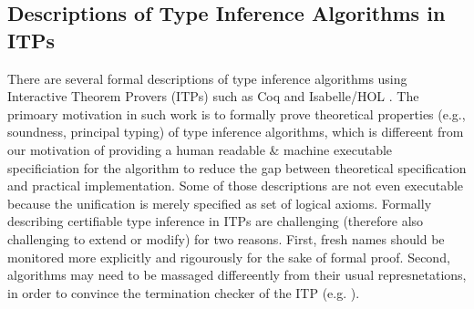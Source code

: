 \subsection{Descriptions of Type Inference Algorithms in ITPs}
There are several formal descriptions of type inference algorithms using
Interactive Theorem Provers (ITPs) such as Coq \cite{Dubois00} and
Isabelle/HOL \cite{UrbanN2009}. The primoary motivation %
in such work is to formally prove theoretical properties (e.g., soundness,
principal typing) of type inference algorithms, which is differeent from
our motivation of providing a human readable \& machine executable
specificiation for the algorithm to reduce the gap between
theoretical specification and practical implementation. Some of those
descriptions  are not even executable because the unification is merely
specified as set of logical axioms.
Formally describing certifiable type inference in ITPs are challenging
(therefore also challenging to extend or modify) for two reasons. First, fresh
names should be monitored more explicitly and rigourously for the sake of
formal proof. Second, algorithms may need to be massaged differeently from
their usual represnetations, in order to convince the termination checker of
the ITP (e.g. \cite{JFP:185139}).

